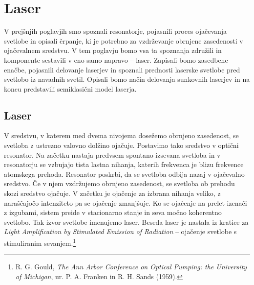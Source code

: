 
\chapter{Laser}

V prejšnjih poglavjih smo spoznali resonatorje, pojasnili proces ojačevanja svetlobe in 
opisali črpanje, ki je potrebno za vzdrževanje obrnjene zasedenosti v ojačevalnem sredstvu. 
V tem poglavju bomo vsa ta
spoznanja združili in komponente sestavili v eno samo napravo -- laser. Zapisali
bomo zasedbene enačbe, pojasnili delovanje laserjev in spoznali prednosti 
laserske svetlobe pred svetlobo iz navadnih svetil. Opisali bomo način delovanja 
sunkovnih laserjev in na koncu predstavili semiklasični model laserja. 

\section{Laser}
V sredstvu, v katerem med dvema nivojema dosežemo obrnjeno 
zasedenost, se svetloba z ustrezno valovno dolžino ojačuje. 
Postavimo tako sredstvo v optični resonator.  
Na začetku nastaja predvsem spontano izsevana svetloba in 
v resonatorju se vzbujajo tista lastna nihanja, katerih frekvenca je blizu frekvence
atomskega prehoda. Resonator poskrbi, da se svetloba odbija nazaj v ojačevalno 
sredstvo. Če v njem vzdržujemo obrnjeno zasedenost, se svetloba ob prehodu skozi 
sredstvo ojačuje.
V začetku je ojačenje za
izbrana nihanja veliko, z naraščajočo intenziteto pa se ojačenje zmanjšuje.
Ko se ojačenje na prelet izenači z izgubami, sistem preide v stacionarno stanje in 
seva močno koherentno svetlobo. Tak
izvor svetlobe imenujemo laser. Beseda laser je nastala iz kratice za {\it Light
Amplification by Stimulated Emission of Radiation} --  ojačenje svetlobe s
stimuliranim sevanjem.\footnote{R. G. Gould, {\it The Ann Arbor Conference on Optical Pumping: 
the University of Michigan}, ur. P. A. Franken in R. H. Sands (1959).}

